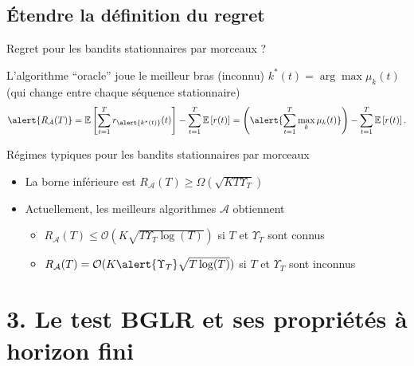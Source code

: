 \documentclass[11pt,french,ignorenonframetext,]{beamer}
\providecommand{\tightlist}{%
  \setlength{\itemsep}{0pt}\setlength{\parskip}{0pt}}
\begin{document}
\subsection{\hfill{}Étendre la définition du regret\hfill{}}

\begin{frame}{Regret pour les bandits stationnaires par morceaux ?}

  L'algorithme ``oracle'' joue le meilleur bras (inconnu) $k^*(t) = \arg\max \mu_k(t)$
  (qui change entre chaque séquence stationnaire)
  \[ \alert{ R_{\mathcal{A}}(T) } = \mathbb{E}\left[ \sum\limits_{t=1}^T r_{\alert{k^*(t)}}(t) \right] - \sum\limits_{t=1}^T \mathbb{E}\left[ r(t) \right] = \left(\alert{\sum_{t=1}^T \max_k \mu_k(t)} \right) - \sum\limits_{t=1}^T \mathbb{E}\left[ r(t) \right]. \]

\pause
\vspace*{10pt}

\begin{exampleblock}{Régimes typiques pour les bandits stationnaires par morceaux}
  \begin{itemize}
  \item
  La borne inférieure est
  $R_{\mathcal{A}}(T) \geq \Omega(\sqrt{K T \Upsilon_T})$

  \item
  Actuellement, les meilleurs algorithmes $\mathcal{A}$  obtiennent
    \begin{itemize}\tightlist
      \item
      $R_{\mathcal{A}}(T) \leq \mathcal{O}(K \sqrt{T \Upsilon_T \log(T)})$
      si $T$ et $\Upsilon_T$ sont connus
      \item
      $R_{\mathcal{A}}(T) = \mathcal{O}(K \alert{\Upsilon_T} \sqrt{T \log(T)})$
      si $T$ et $\Upsilon_T$ sont inconnus
    \end{itemize}
  \end{itemize}
\end{exampleblock}

\end{frame}


\section{\hfill{}3. Le test BGLR et ses propriétés à horizon fini\hfill{}}
\end{document}
